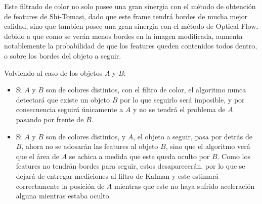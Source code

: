 Este filtrado de color no solo posee una gran sinergia con el método de obtención de features de Shi-Tomasi, dado que este frame tendrá bordes de mucha mejor calidad, sino que tambíen posee una gran sinergia con el método de Optical Flow, debido a que como se verán menos bordes en la imagen modificada, aumenta notablemente la probabilidad de que los features queden contenidos todos dentro, o sobre los bordes del objeto a seguir.

Volviendo al caso de los objetos $A$ y $B$:

\begin{itemize}
\item Si $A$ y $B$ son de colores distintos, con el filtro de color, el algoritmo nunca detectará que existe un objeto $B$ por lo que seguirlo será imposible, y por consecuencia seguirá únicamente a $A$ y no se tendrá el problema de $A$ pasando por frente de $B$.
\item Si $A$ y $B$ son de colores distintos, y $A$, el objeto a seguir, pasa por detrás de $B$, ahora no se adosarán las features al objeto $B$, sino que el algoritmo verá que el área de $A$ se achica a medida que este queda oculto por $B$. Como los features no tendrán bordes para seguir, estos desaparecerán, por lo que se dejará de entregar mediciones al filtro de Kalman y este estimará correctamente la posición de $A$ mientras que este no haya sufrido aceleración alguna mientras estaba oculto. 
\end{itemize}

